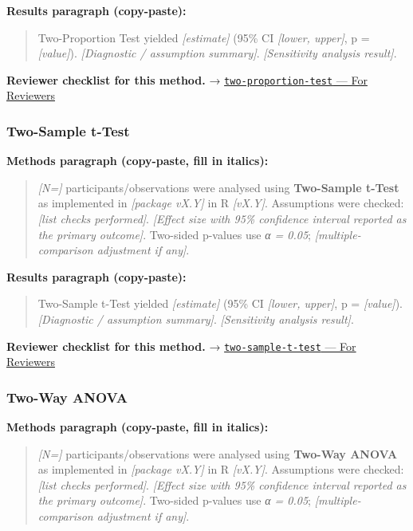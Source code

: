 \documentclass[
]{article}
\begin{document}
\textbf{Results paragraph (copy-paste):}

\begin{quote}
Two-Proportion Test yielded \emph{{[}estimate{]}} (95\% CI
\emph{{[}lower, upper{]}}, p = \emph{{[}value{]}}). \emph{{[}Diagnostic
/ assumption summary{]}}. \emph{{[}Sensitivity analysis result{]}}.
\end{quote}

\textbf{Reviewer checklist for this method.} →
\href{../chapters/04-inferential/two-proportion-test.Rmd\#for-reviewers}{\texttt{two-proportion-test}
--- For Reviewers}

\subsubsection{Two-Sample t-Test}\label{two-sample-t-test}

\textbf{Methods paragraph (copy-paste, fill in italics):}

\begin{quote}
\emph{{[}N={]}} participants/observations were analysed using
\textbf{Two-Sample t-Test} as implemented in \emph{{[}package vX.Y{]}}
in R \emph{{[}vX.Y{]}}. Assumptions were checked: \emph{{[}list checks
performed{]}}. \emph{{[}Effect size with 95\% confidence interval
reported as the primary outcome{]}}. Two-sided p-values use \emph{α =
0.05}; \emph{{[}multiple-comparison adjustment if any{]}}.
\end{quote}

\textbf{Results paragraph (copy-paste):}

\begin{quote}
Two-Sample t-Test yielded \emph{{[}estimate{]}} (95\% CI \emph{{[}lower,
upper{]}}, p = \emph{{[}value{]}}). \emph{{[}Diagnostic / assumption
summary{]}}. \emph{{[}Sensitivity analysis result{]}}.
\end{quote}

\textbf{Reviewer checklist for this method.} →
\href{../chapters/04-inferential/two-sample-t-test.Rmd\#for-reviewers}{\texttt{two-sample-t-test}
--- For Reviewers}

\subsubsection{Two-Way ANOVA}\label{two-way-anova}

\textbf{Methods paragraph (copy-paste, fill in italics):}

\begin{quote}
\emph{{[}N={]}} participants/observations were analysed using
\textbf{Two-Way ANOVA} as implemented in \emph{{[}package vX.Y{]}} in R
\emph{{[}vX.Y{]}}. Assumptions were checked: \emph{{[}list checks
performed{]}}. \emph{{[}Effect size with 95\% confidence interval
reported as the primary outcome{]}}. Two-sided p-values use \emph{α =
0.05}; \emph{{[}multiple-comparison adjustment if any{]}}.
\end{quote}
\end{document}
